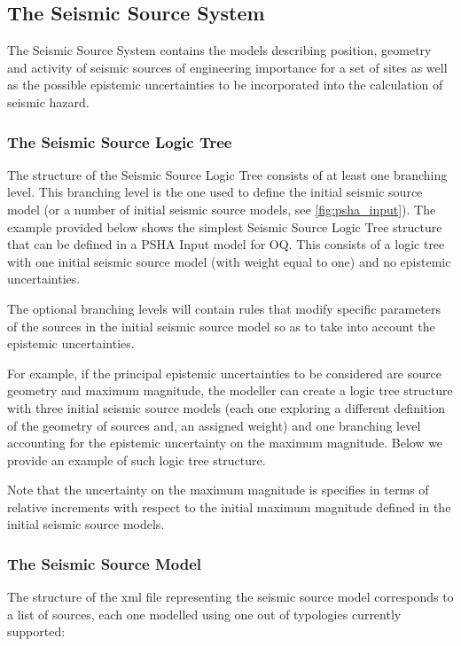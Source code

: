\subsection{The Seismic Source System}
The Seismic Source System contains the models describing position, geometry 
and activity of seismic sources of engineering importance for a set of sites
as well as the possible epistemic uncertainties to be incorporated into the 
calculation of seismic hazard.
%
\subsubsection{The Seismic Source Logic Tree}
The structure of the Seismic Source Logic Tree consists of at least one 
branching level. This branching level is the one used to define the 
initial seismic source model (or a number of initial seismic source models, 
see \ref{fig:psha_input}). 
%
The example provided below shows the simplest Seismic Source Logic Tree 
structure that can be defined in a PSHA Input model for OQ. This consists
of a logic tree with one initial seismic source model (with weight equal 
to one) and no epistemic uncertainties.


The optional branching levels will contain rules that modify specific 
parameters of the sources in the initial seismic source model so as to 
take into account the epistemic uncertainties. 

For example, if the principal epistemic uncertainties to be considered are
source geometry and maximum magnitude, the modeller can create a logic tree
structure with three initial seismic source models (each one exploring a 
different definition of the geometry of sources and, an assigned weight) 
and one branching level accounting for the epistemic uncertainty on the 
maximum magnitude.
%
Below we provide an example of such logic tree structure.

Note that the uncertainty on the maximum magnitude is specifies in terms 
of relative increments with respect to the initial maximum magnitude 
defined in the initial seismic source models.
%
\subsubsection{The Seismic Source Model}
The structure of the xml file representing the seismic source 
model corresponds to a list of sources, each one modelled using 
one out of typologies currently supported:

%
